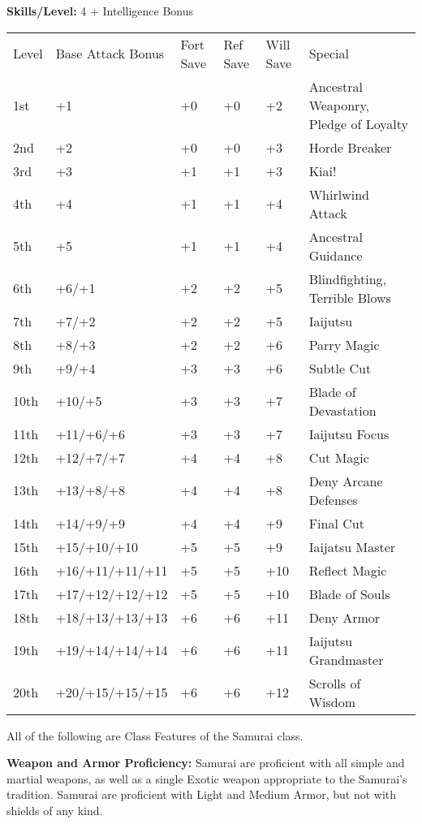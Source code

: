 \documentclass[10pt]{article}
\newcommand{\ability}[2]{\smallskip \noindent \textbf{#1} #2}
\begin{document}
\ability{Skills/Level:}{4 + Intelligence Bonus}



\begin{table}[tbh]
\begin{small}
\begin{tabular}{lp{3cm}p{0.7cm}p{0.7cm}p{0.7cm}l}
Level  &Base Attack Bonus &Fort Save &Ref Save &Will Save &Special\\
1st &+1 &+0 &+0 &+2 &Ancestral Weaponry, Pledge of Loyalty\\
2nd &+2 &+0 &+0 &+3 &Horde Breaker\\
3rd &+3 &+1 &+1 &+3 &Kiai!\\
4th &+4 &+1 &+1 &+4 &Whirlwind Attack\\
5th &+5 &+1 &+1 &+4 &Ancestral Guidance\\
6th &+6/+1 &+2 &+2 &+5 &Blindfighting, Terrible Blows\\
7th &+7/+2 &+2 &+2 &+5 &Iaijutsu\\
8th &+8/+3 &+2 &+2 &+6 &Parry Magic\\
9th &+9/+4 &+3 &+3 &+6 &Subtle Cut\\
10th &+10/+5 &+3 &+3 &+7 &Blade of Devastation\\
11th &+11/+6/+6 &+3 &+3 &+7 &Iaijutsu Focus\\
12th &+12/+7/+7 &+4 &+4 &+8 &Cut Magic\\
13th &+13/+8/+8 &+4 &+4 &+8 &Deny Arcane Defenses\\
14th &+14/+9/+9 &+4 &+4 &+9 &Final Cut\\
15th &+15/+10/+10 &+5 &+5 &+9 &Iaijatsu Master\\
16th &+16/+11/+11/+11 &+5 &+5 &+10 &Reflect Magic\\
17th &+17/+12/+12/+12 &+5 &+5 &+10 &Blade of Souls\\
18th &+18/+13/+13/+13 &+6 &+6 &+11 &Deny Armor\\
19th &+19/+14/+14/+14 &+6 &+6 &+11 &Iaijutsu Grandmaster\\
20th &+20/+15/+15/+15 &+6 &+6 &+12 &Scrolls of Wisdom\\
\end{tabular}
\end{small}
\end{table}

\noindent All of the following are Class Features of the Samurai class.

\ability{Weapon and Armor Proficiency:}{Samurai are proficient with all simple and martial weapons, as well as a single Exotic weapon appropriate to the Samurai's tradition. Samurai are proficient with Light and Medium Armor, but not with shields of any kind.}
\end{document}
